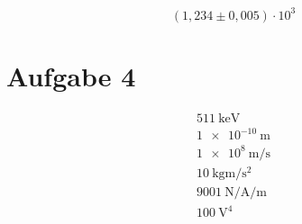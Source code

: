 \documentclass{scrartcl}
\begin{document}
\begin{equation}
  (1{,}234 \pm 0{,}005) \cdot 10^3
\end{equation}

\section*{Aufgabe 4}

\begin{gather}
  \qty{511}{\kilo\electronvolt} \\
  \qty{1e-10}{\metre} \\
  \qty{1e8}{\metre\per\second} \\
  \qty{10}{\kilo\gram\metre\per\square\second} \\
  \qty{9001}{\newton\per\ampere\per\metre} \\
  \qty{100}{\volt\tothe{4}}
\end{gather}
\end{document}
